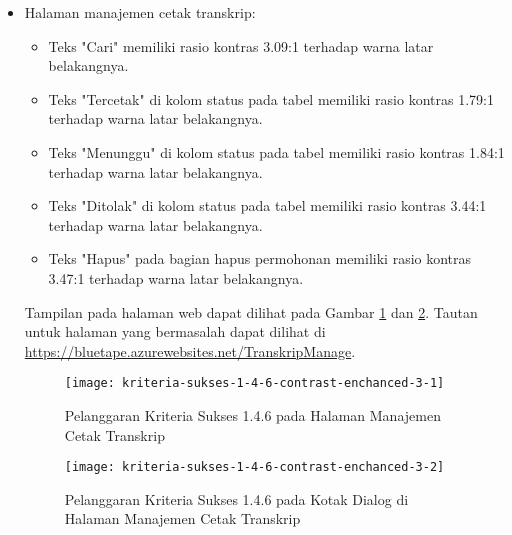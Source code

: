 \begin{itemize}
    \item Halaman manajemen cetak transkrip: 
    \begin{itemize}
        \item Teks "Cari" memiliki rasio kontras 3.09:1 terhadap warna latar belakangnya.
        \item Teks "Tercetak" di kolom status pada tabel memiliki rasio kontras 1.79:1 terhadap warna latar belakangnya.
        \item Teks "Menunggu" di kolom status pada tabel memiliki rasio kontras 1.84:1 terhadap warna latar belakangnya.
        \item Teks "Ditolak" di kolom status pada tabel memiliki rasio kontras 3.44:1 terhadap warna latar belakangnya.
        \item Teks "Hapus" pada bagian hapus permohonan memiliki rasio kontras 3.47:1 terhadap warna latar belakangnya.
    \end{itemize}
    Tampilan pada halaman web dapat dilihat pada Gambar \ref{fig:1.4.6_contrast_enchanced_3_1} dan \ref{fig:1.4.6_contrast_enchanced_3_2}. Tautan untuk halaman yang bermasalah dapat dilihat di \url{https://bluetape.azurewebsites.net/TranskripManage}.
    \begin{figure}[H]
        \centering  
        \texttt{[image: kriteria-sukses-1-4-6-contrast-enchanced-3-1]}  
        \caption[Pelanggaran Kriteria Sukses 1.4.6 pada Halaman Manajemen Cetak Transkrip ]{Pelanggaran Kriteria Sukses 1.4.6 pada Halaman Manajemen Cetak Transkrip}
        \label{fig:1.4.6_contrast_enchanced_3_1}  
    \end{figure} 
    
    \begin{figure}[H]
        \centering  
        \texttt{[image: kriteria-sukses-1-4-6-contrast-enchanced-3-2]}  
        \caption[Pelanggaran Kriteria Sukses 1.4.6 pada Kotak Dialog di Halaman Manajemen Cetak Transkrip]{Pelanggaran Kriteria Sukses 1.4.6 pada Kotak Dialog di Halaman Manajemen Cetak Transkrip}
        \label{fig:1.4.6_contrast_enchanced_3_2}  
    \end{figure} 


\end{itemize}
